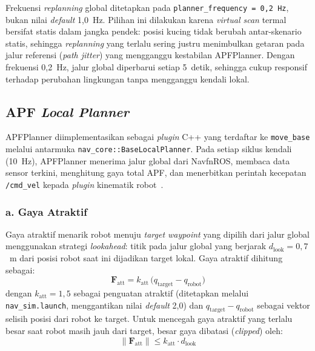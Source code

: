 Frekuensi \textit{replanning} global ditetapkan pada \texttt{planner\_frequency = 0,2~Hz}, bukan nilai \textit{default} 1,0~Hz. Pilihan ini dilakukan karena \textit{virtual scan} termal bersifat statis dalam jangka pendek: posisi kucing tidak berubah antar-skenario statis, sehingga \textit{replanning} yang terlalu sering justru menimbulkan getaran pada jalur referensi (\textit{path jitter}) yang mengganggu kestabilan APFPlanner. Dengan frekuensi 0,2~Hz, jalur global diperbarui setiap 5~detik, sehingga cukup responsif terhadap perubahan lingkungan tanpa mengganggu kendali lokal.

\subsection{APF \textit{Local Planner}}
\label{sec:apf_planner}

APFPlanner diimplementasikan sebagai \textit{plugin} C++ yang terdaftar ke \texttt{move\_base} melalui antarmuka \texttt{nav\_core::BaseLocalPlanner}. Pada setiap siklus kendali (10~Hz), APFPlanner menerima jalur global dari NavfnROS, membaca data sensor terkini, menghitung gaya total APF, dan menerbitkan perintah kecepatan \texttt{/cmd\_vel} kepada \textit{plugin} kinematik robot~\cite{Khatib1986}.

\subsubsection*{a. Gaya Atraktif}

Gaya atraktif menarik robot menuju \textit{target waypoint} yang dipilih dari jalur global menggunakan strategi \textit{lookahead}: titik pada jalur global yang berjarak $d_\text{look} = 0{,}7$~m dari posisi robot saat ini dijadikan target lokal. Gaya atraktif dihitung sebagai:
\begin{equation}
    \mathbf{F}_\text{att} = k_\text{att}\,\bigl(q_\text{target} - q_\text{robot}\bigr)
    \label{eq:f_att}
\end{equation}
dengan $k_\text{att} = 1{,}5$ sebagai penguatan atraktif (ditetapkan melalui \texttt{nav\_sim.launch}, menggantikan nilai \textit{default} 2,0) dan $q_\text{target} - q_\text{robot}$ sebagai vektor selisih posisi dari robot ke target. Untuk mencegah gaya atraktif yang terlalu besar saat robot masih jauh dari target, besar gaya dibatasi (\textit{clipped}) oleh:
\begin{equation}
    \|\mathbf{F}_\text{att}\| \leq k_\text{att} \cdot d_\text{look}
    \label{eq:f_att_clip}
\end{equation}

